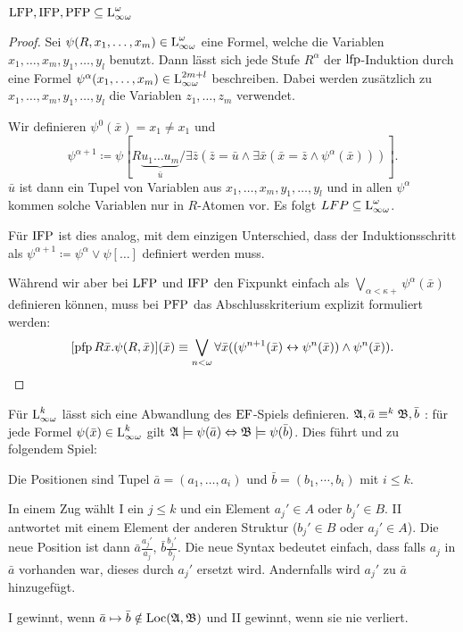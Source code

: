 \begin{satz}
	$\operatorname{LFP}, \operatorname{IFP}, \operatorname{PFP} \subseteq \operatorname{L}_{\infty\omega}^\omega$
\end{satz}
\begin{proof}
	Sei $\psi(R,x_1,\dots,x_m)\in \operatorname{L}_{\infty\omega}^\omega$ eine Formel, welche die Variablen $x_1,\dots,x_m,y_1,\dots,y_l$ benutzt. Dann lässt sich jede Stufe $R^\alpha$ der $\operatorname{lfp}$-Induktion durch eine Formel $\psi^\alpha(x_1,\dots,x_m)\in \operatorname{L}_{\infty\omega}^{2m+l}$ beschreiben. 
	Dabei werden zusätzlich zu $x_1,\dots,x_m,y_1,\dots,y_l$ die Variablen $z_1,\dots,z_m$ verwendet.
	
	Wir definieren $\psi^0(\bar{x})=x_1\neq x_1$ und 
	\[\psi^{\alpha+1}\coloneqq \psi[R \underbrace{u_1 \dots u_m}_{\bar{u}} / \exists \bar{z}(\bar{z}=\bar{u} \land \exists \bar{x}(\bar{x}=\bar{z} \land \psi^\alpha(\bar{x})))].\]
	$\bar{u}$ ist dann ein Tupel von Variablen aus $x_1,\dots,x_m,y_1,\dots,y_l$ und in allen $\psi^\alpha$ kommen solche Variablen nur in $R$-Atomen vor. Es folgt $LFP\subseteq \operatorname{L}_{\infty\omega}^\omega$.
	
	Für $\operatorname{IFP}$ ist dies analog, mit dem einzigen Unterschied, dass der Induktionsschritt als $\psi^{\alpha+1}\coloneq \psi^\alpha \lor \psi[\dots]$ definiert werden muss.
	
	Während wir aber bei $\operatorname{LFP}$ und $\operatorname{IFP}$ den Fixpunkt einfach als $\bigvee_{\alpha<\kappa+} \psi^\alpha(\bar{x})$ definieren können, muss bei $\operatorname{PFP}$ das Abschlusskriterium explizit formuliert werden:
	\[[\operatorname{pfp} R\bar{x} . \psi(R,\bar{x})](\bar{x}) \equiv
	\bigvee_{n<\omega}\forall \bar{x}((\psi^{n+1}(\bar{x}) \leftrightarrow \psi^n(\bar{x})) \land \psi^n(\bar{x})).\]
\end{proof}

Für $\operatorname{L}_{\infty\omega}^k$ lässt sich eine Abwandlung des $\operatorname{EF}$-Spiels definieren. $\mathfrak{A},\bar{a}\equiv^k \mathfrak{B},\bar{b}$ : für jede Formel $\psi(\bar{x})\in \operatorname{L}_{\infty\omega}^k$ gilt $\mathfrak{A}\models \psi(\bar{a}) \Leftrightarrow \mathfrak{B}\models \psi(\bar{b})$. Dies führt und zu folgendem Spiel:

\begin{definition}
	Die Positionen sind Tupel $\bar{a}=(a_1,\dots,a_i)$ und $\bar{b}=(b_1,\dotsm,b_i)$ mit $i\leq k$.
	
	In einem Zug wählt I ein $j\leq k$ und ein Element $a_j'\in A$ oder $b_j'\in B$. II antwortet mit einem Element der anderen Struktur ($b_j'\in B$ oder $a_j'\in A$). Die neue Position ist dann $\bar{a}\frac{a_j'}{a_j}$, $\bar{b}\frac{b_j'}{b_j}$.
	Die neue Syntax bedeutet einfach, dass falls $a_j$ in $\bar{a}$ vorhanden war, dieses durch $a_j'$ ersetzt wird. Andernfalls wird $a_j'$ zu $\bar{a}$ hinzugefügt.
	
	I gewinnt, wenn $\bar{a}\mapsto\bar{b}\notin\operatorname{Loc}(\mathfrak{A},\mathfrak{B})$ und II gewinnt, wenn sie nie verliert.
\end{definition}

